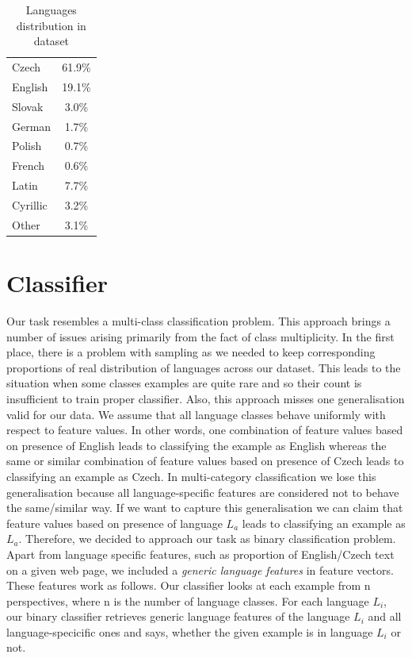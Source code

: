 \documentclass{acm_proc_article-sp}
\begin{document}
  \begin{table}[]
 \centering
 \caption{Languages distribution in dataset} 
 \label{langdist} 
 \vspace{0.5cm}
 \begin{tabular}{l||c}
    Czech & 61.9\% \\
    English & 19.1\% \\
    Slovak & 3.0\% \\
    German & 1.7\% \\
    Polish & 0.7\% \\
    French & 0.6\% \\ \hline
    Latin & 7.7\% \\
    Cyrillic & 3.2\% \\
    Other & 3.1\% \\
 \end{tabular}
 \end{table}


  \section{Classifier}

  Our task resembles a multi-class classification problem. 
  This approach brings a number of issues arising primarily from the fact of class multiplicity. 
  In the first place, there is a problem with sampling as we needed to keep corresponding proportions 
  of real distribution of languages across our dataset. 
  This leads to the situation when some classes examples are quite rare and so their count is insufficient 
  to train proper classifier. Also, this approach misses one generalisation valid for our data.
  We assume that all language classes behave uniformly with respect to feature values. In other words, 
  one combination of feature values based on presence of English leads to classifying the example as English whereas 
  the same or similar combination of feature values based on presence of Czech leads to classifying an example as Czech.
  In multi-category classification we lose this generalisation because all language-specific features are considered
  not to behave the same/similar way. If we want to capture this generalisation we can claim that feature values based on 
  presence of language $L_a$ leads to classifying an example as $L_a$. Therefore, we decided to approach our task as binary 
  classification problem. Apart from language specific features, such as proportion of English/Czech text on a given 
  web page, we included a \textit{generic language features} in feature vectors. These features work as follows.
  Our classifier looks at each example from n perspectives, where n is the number of language classes. 
  For each language $L_i$, our binary classifier retrieves generic language features of the language $L_i$ and all language-specicific
  ones and says, whether the given example is in language $L_i$ or not. 
\end{document}
